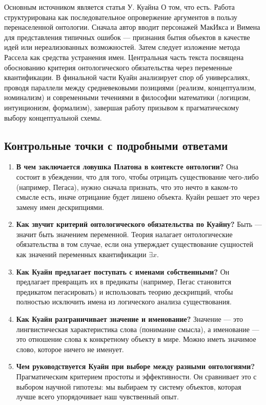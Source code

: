 \documentclass[a4paper,12pt]{article}
\begin{document}
Основным источником является статья У. Куайна О том, что есть. Работа структурирована как последовательное опровержение аргументов в пользу перенаселенной онтологии. Сначала автор вводит персонажей МакИкса и Вимена для представления типичных ошибок — признания бытия объектов в качестве идей или нереализованных возможностей. Затем следует изложение метода Рассела как средства устранения имен. Центральная часть текста посвящена обоснованию критерия онтологического обязательства через переменные квантификации. В финальной части Куайн анализирует спор об универсалиях, проводя параллели между средневековыми позициями (реализм, концептуализм, номинализм) и современными течениями в философии математики (логицизм, интуиционизм, формализм), завершая работу призывом к прагматическому выбору концептуальной схемы.

\subsection{Контрольные точки с подробными ответами}

\begin{enumerate}
    \item \textbf{В чем заключается ловушка Платона в контексте онтологии?}
    Она состоит в убеждении, что для того, чтобы отрицать существование чего-либо (например, Пегаса), нужно сначала признать, что это нечто в каком-то смысле есть, иначе отрицание будет лишено объекта. Куайн решает это через замену имен дескрипциями.
    \item \textbf{Как звучит критерий онтологического обязательства по Куайну?}
    Быть — значит быть значением переменной. Теория налагает онтологические обязательства в том случае, если она утверждает существование сущностей как значений переменных квантификации $\exists x$.
    \item \textbf{Как Куайн предлагает поступать с именами собственными?}
    Он предлагает превращать их в предикаты (например, Пегас становится предикатом пегасировать) и использовать теорию дескрипций, чтобы полностью исключить имена из логического анализа существования.
    \item \textbf{Как Куайн разграничивает значение и именование?}
    Значение — это лингвистическая характеристика слова (понимание смысла), а именование — это отношение слова к конкретному объекту в мире. Можно иметь значимое слово, которое ничего не именует.
    \item \textbf{Чем руководствуется Куайн при выборе между разными онтологиями?}
    Прагматическим критерием простоты и эффективности. Он сравнивает это с выбором научной гипотезы: мы выбираем ту систему объектов, которая лучше всего упорядочивает наш чувственный опыт.
\end{enumerate}
\end{document}

